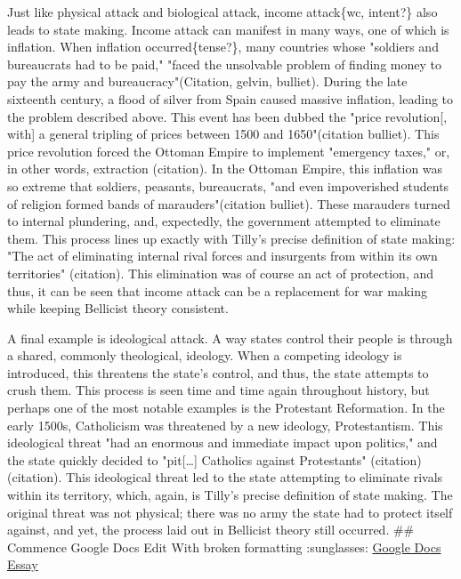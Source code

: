 \documentclass[letterpaper]{article}
\begin{document}
Just like physical attack and biological attack, income attack\{wc,
intent?\} also leads to state making. Income attack can manifest in many
ways, one of which is inflation. When inflation occurred\{tense?\}, many
countries whose "soldiers and bureaucrats had to be paid," "faced the
unsolvable problem of finding money to pay the army and
bureaucracy"(Citation, gelvin, bulliet). During the late sixteenth
century, a flood of silver from Spain caused massive inflation, leading
to the problem described above. This event has been dubbed the "price
revolution[, with] a general tripling of prices between 1500 and
1650"(citation bulliet). This price revolution forced the Ottoman Empire
to implement "emergency taxes," or, in other words, extraction
(citation). In the Ottoman Empire, this inflation was so extreme that
soldiers, peasants, bureaucrats, "and even impoverished students of
religion formed bands of marauders"(citation bulliet). These marauders
turned to internal plundering, and, expectedly, the government attempted
to eliminate them. This process lines up exactly with Tilly's precise
definition of state making: "The act of eliminating internal rival
forces and insurgents from within its own territories" (citation). This
elimination was of course an act of protection, and thus, it can be seen
that income attack can be a replacement for war making while keeping
Bellicist theory consistent.

A final example is ideological attack. A way states control their people
is through a shared, commonly theological, ideology. When a competing
ideology is introduced, this threatens the state's control, and thus,
the state attempts to crush them. This process is seen time and time
again throughout history, but perhaps one of the most notable examples
is the Protestant Reformation. In the early 1500s, Catholicism was
threatened by a new ideology, Protestantism. This ideological threat
"had an enormous and immediate impact upon politics," and the state
quickly decided to "pit[\ldots{}] Catholics against Protestants"
(citation)(citation). This ideological threat led to the state
attempting to eliminate rivals within its territory, which, again, is
Tilly's precise definition of state making. The original threat was not
physical; there was no army the state had to protect itself against, and
yet, the process laid out in Bellicist theory still occurred. \#\#
Commence Google Docs Edit With broken formatting :sunglasses:
\href{https://docs.google.com/document/d/1bhHnfqcC083889JImMnP\_sD7S8siIN8k4C3tW6fxGfQ/edit?usp=sharing}{Google
Docs Essay}
\end{document}

